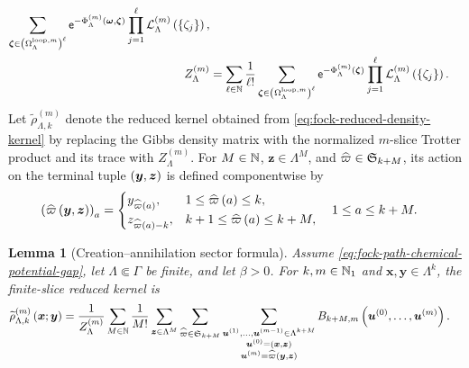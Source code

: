 \documentclass[11pt,a4paper]{article}
\theoremstyle{plain}
\newtheorem{lem}[thm]{Lemma}
\theoremstyle{definition}
\theoremstyle{remark}
\begin{document}
\begin{equation}
\begin{aligned}
\sum_{\boldsymbol{\zeta} \in \left( \Omega_{\Lambda}^{\mathrm{loop},m} \right)^{\ell}}
\mathsf{e}^{-\Phi_{\Lambda}^{(m)} \left( \boldsymbol{\omega},\boldsymbol{\zeta} \right)}
\prod_{j = 1}^{\ell}
\mathcal{L}_{\Lambda}^{(m)} \left( \left\{ \zeta_j \right\} \right),
\\
Z_{\Lambda}^{(m)}
& =
\sum_{\ell \in \mathbb{N}}\frac{1}{\ell!}
\sum_{\boldsymbol{\zeta} \in \left( \Omega_{\Lambda}^{\mathrm{loop},m} \right)^{\ell}}
\mathsf{e}^{-\Phi_{\Lambda}^{(m)} \left( \boldsymbol{\zeta} \right)}
\prod_{j = 1}^{\ell}
\mathcal{L}_{\Lambda}^{(m)} \left( \left\{ \zeta_j \right\} \right).
\end{aligned}
\label{eq:fock-discrete-open-path-loop-partition-functions}
\end{equation} Let \(\widetilde{\rho}_{\Lambda,k}^{(m)}\) denote the reduced kernel obtained from \eqref{eq:fock-reduced-density-kernel} by replacing the Gibbs density matrix with the normalized \(m\)-slice Trotter product and its trace with \(Z_{\Lambda}^{(m)}\). For \(M\in\mathbb{N}\), \(\boldsymbol{z}\in\Lambda^M\), and \(\widehat{\varpi} \in \grsym{k+M}\), its action on the terminal tuple \(\left( \boldsymbol{y},\boldsymbol{z} \right)\) is defined componentwise by \begin{equation}
\begin{aligned}
\left( \widehat{\varpi} \left( \boldsymbol{y},\boldsymbol{z} \right) \right)_a
& =
\begin{cases}
y_{\widehat{\varpi} \left( a \right)}, & 1 \leq \widehat{\varpi} \left( a \right) \leq k,\\
z_{\widehat{\varpi} \left( a \right)-k}, & k+1 \leq \widehat{\varpi} \left( a \right) \leq k+M,
\end{cases}
\quad
1 \leq a \leq k+M.
\end{aligned}
\label{eq:fock-permuted-terminal-tuple}
\end{equation}

\begin{lem}[Creation--annihilation sector formula]\label{lem:fock-creation-annihilation-sector-formula}
Assume \eqref{eq:fock-path-chemical-potential-gap}, let $\Lambda\Subset\Gamma$ be finite, and let $\beta>0$.
For $k,m\in\mathbb{N}_1$ and $\boldsymbol{x},\boldsymbol{y}\in\Lambda^k$, the finite-slice reduced kernel is
\begin{equation}
\begin{aligned}
\fun{\widetilde{\rho}_{\Lambda,k}^{(m)}}{\boldsymbol{x};\boldsymbol{y}}
& =
\frac{1}{Z_{\Lambda}^{(m)}}
\sum_{M \in \monnat}\frac{1}{M!}
\sum_{\boldsymbol{z} \in \Lambda^M}
\sum_{\widehat{\varpi} \in \grsym{k+M}}
\sum_{\substack{
\boldsymbol{u}^{(1)},\ldots,\boldsymbol{u}^{(m-1)} \in \Lambda^{k+M}\\
\boldsymbol{u}^{(0)} = \rbk{\boldsymbol{x},\boldsymbol{z}}\\
\boldsymbol{u}^{(m)} = \fun{\widehat{\varpi}}{\boldsymbol{y},\boldsymbol{z}}}}
\fun{B_{k+M,m}}{\boldsymbol{u}^{(0)},\ldots,\boldsymbol{u}^{(m)}}.
\end{aligned}
\label{eq:fock-creation-annihilation-sector-formula}
\end{equation}
\end{lem}
\end{document}
